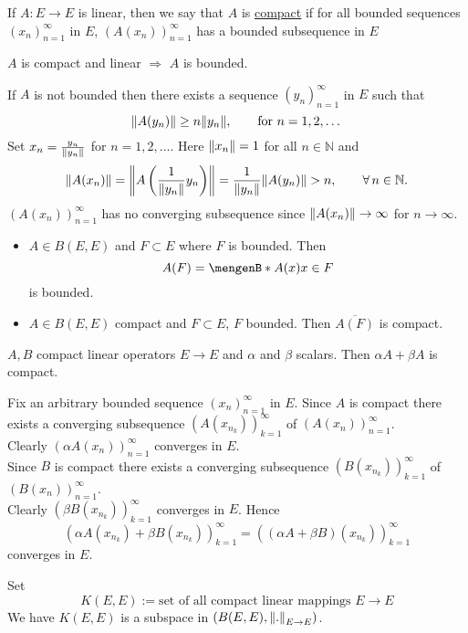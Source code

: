 
\begin{definition}[compact]
	If $A: E \to E$ is linear, then we say that $A$ is \underline{compact} if for all bounded sequences $(x_n)_{n=1}^{\infty}$ in $E$, $ (A(x_n))_{n=1}^{\infty}$ has a bounded subsequence in $E$
\end{definition}

\begin{lemma}
	$A$ is compact and linear \qquad  $\Rightarrow $ \qquad  $A$ is bounded.
\end{lemma}
\begin{beweis}
	If $A$ is not bounded then there exists a sequence $(y_n)_{n=1}^{\infty}$ in $E$ such that
	\[
		\norm{A(y_n)} \geq n \norm{y_n}, \qquad \text{for }n=1,2,\dots
	\]
	Set $x_n = \frac{y_n}{\norm{y_n}}$ for $n = 1,2,\dots$. Here $\norm{x_n}=1$ for all $n \in \mathbb{N}$ and 
	\[
		\norm{A(x_n)} = \norm{A \left( \frac{1}{\norm{y_n}}y_n \right)} = \frac{1}{\norm{y_n}} \norm{A(y_n)} >n, \qquad \forall\, n \in \mathbb{N}.
	\]
	$(A(x_n))_{n=1}^{\infty}$ has no converging subsequence since $\norm{A(x_n)} \to \infty$ for $n \to \infty$.
\end{beweis}
\begin{bemerkung}
	\begin{itemize}
		\item $A \in B(E,E)$ and $F \subset E$ where $F$ is bounded. Then
		\[
			A(F) = \set[A(x)]{x \in F} 
		\]
		is bounded.
		\item $A \in B(E,E)$ compact and $F \subset E$, $F$ bounded. Then $\overline{A(F)}$ is compact.
	\end{itemize}
\end{bemerkung}

\begin{lemma}
	$A,B$ compact linear operators $E \to E$ and $\alpha$ and $\beta$ scalars. Then $\alpha A+ \beta A$ is compact.
\end{lemma}
\begin{beweis}
	Fix an arbitrary bounded sequence $(x_n)_{n=1}^{\infty}$ in $E$. Since $A$ is compact there exists a converging subsequence $(A(x_{n_k}))_{k=1}^{\infty}$ of $(A(x_n))_{n=1}^{\infty}$. \\ Clearly $(\alpha A(x_n))_{n=1}^{\infty}$ converges in $E$. \\ Since $B$ is compact there exists a converging subsequence $(B(x_{n_k}))_{k=1}^{\infty}$ of $(B(x_n))_{n=1}^{\infty}$.  \\ Clearly $(\beta B(x_{n_k}))_{k=1}^{\infty}$ converges in $E$. Hence
	\[
		\left( \alpha A(x _{n_k}) + \beta B(x _{n_k}) \right)_{k=1}^{\infty} = \left( (\alpha A + \beta B)(x _{n_k}) \right)_{k=1}^{\infty}
	\]
	converges in $E$.
\end{beweis} 
Set \[
	K(E,E) := \text{set of all compact linear mappings $E \to E$}
\]
We have $K(E,E)$ is a subspace in $(B(E,E), \norm{.}_{E \to E})$.

